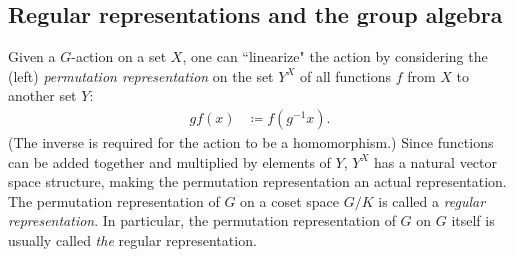 \subsection{Regular representations and the group algebra}\label{ch2:regular}

Given a $G$-action on a set $X$, one can ``linearize" the action by considering the (left) \emph{permutation representation} on the set $Y^X$ of all functions $f$ from $X$ to another set $Y$:
\begin{align}
	gf(x) &\coloneqq f(g^{-1}x).
\end{align}
(The inverse is required for the action to be a homomorphism.) Since functions can be added together and multiplied by elements of $Y$, $Y^X$ has a natural vector space structure, making the permutation representation an actual representation. The permutation representation of $G$ on a coset space $G/K$ is called a \emph{regular representation}. In particular, the permutation representation of $G$ on $G$ itself is usually called \emph{the} regular representation. 



